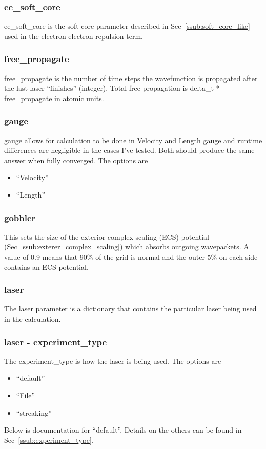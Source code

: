 \documentclass{article}
\begin{document}
\subsubsection{ee\_soft\_core}
ee\_soft\_core is the soft core parameter described in Sec~\ref{ssub:soft_core_like} used in the electron-electron repulsion term.

\subsubsection{free\_propagate}
free\_propagate is the number of time steps the wavefunction is propagated after the last laser ``finishes'' (integer). Total free propagation is delta\_t * free\_propagate in atomic units.

\subsubsection{gauge}
gauge allows for calculation to be done in Velocity and Length gauge and runtime differences are negligible in the cases I've tested. Both should produce the same answer when fully converged. The options are
\begin{itemize}
  \item ``Velocity''
  \item ``Length''
\end{itemize}

\subsubsection{gobbler}
This sets the size of the exterior complex scaling (ECS) potential (Sec~\ref{ssub:exterer_complex_scaling}) which absorbs outgoing wavepackets. A value of 0.9 means that 90\% of the grid is normal and the outer 5\% on each side contains an ECS potential.

\subsubsection{laser}
\label{ssub:laser_parameter}
The laser parameter is a dictionary that contains the particular laser being used in the calculation.

\subsubsection{laser - experiment\_type}
The experiment\_type is how the laser is being used. The options are
\begin{itemize}
  \item ``default''
  \item ``File''
  \item ``streaking''
\end{itemize}
Below is documentation for ``default''. Details on the others can be found in Sec~\ref{ssub:experiment_type}.
\end{document}
